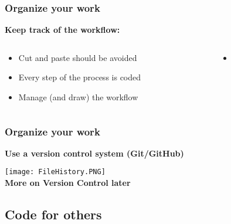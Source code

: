 \documentclass[xcolor=x11names,compress]{beamer}
\renewcommand{\(}{\begin{columns}}
\renewcommand{\)}{\end{columns}}
\newcommand{\<}[1]{\begin{column}{#1}}
\renewcommand{\>}{\end{column}}
\begin{document}
\begin{frame}
\frametitle{Organize your work }
\textcolor{siap}{\textbf{Keep track of the workflow:} \\  }
 \begin{columns}[t]
 \begin{column}{0.5\textwidth}
    \begin{itemize}[<+->]
     \item Cut and paste should be avoided
     \item Every step of the process is coded
     \item Manage (and draw) the workflow
   \end{itemize}
  \end{column}
 \begin{column}{0.5\textwidth}
    \begin{itemize}
        \item[]
    \end{itemize}
  \end{column}
\end{columns}
\end{frame}



\begin{frame}
\frametitle{Organize your work }
\textcolor{siap}{\textbf{Use a version control system  (Git/GitHub)}} \\
\vspace{0.5cm}
\begin{center}
 \texttt{[image: FileHistory.PNG]} \\

\large{\textbf{ More on Version Control later }}

\end{center}
\end{frame}

\subsection{Code for others}
\end{document}

